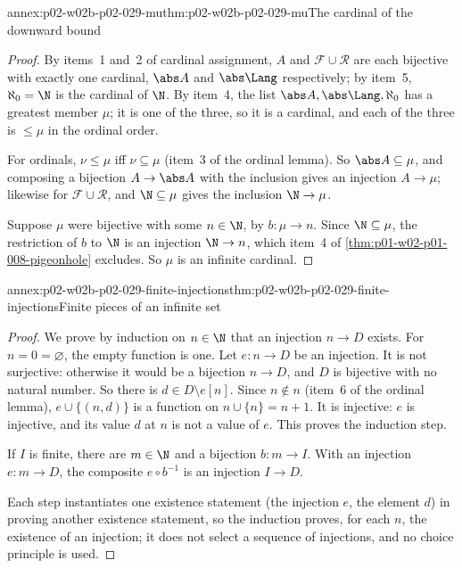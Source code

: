 \begin{annexitem}{annex:p02-w02b-p02-029-mu}{thm:p02-w02b-p02-029-mu}{The cardinal of the downward bound}
\begin{proof}
By items~1 and~2 of cardinal assignment, \(A\) and \(\mathcal F\cup\mathcal R\)
are each bijective with exactly one cardinal, \(\abs A\) and
\(\abs\Lang\) respectively; by item~5, \(\aleph_0=\N\) is the cardinal of
\(\N\). By item~4, the list \(\abs A,\abs\Lang,\aleph_0\) has a greatest
member \(\mu\); it is one of the three, so it is a cardinal, and each of the
three is \(\leq\mu\) in the ordinal order.

For ordinals, \(\nu\leq\mu\) iff \(\nu\subseteq\mu\) (item~3 of the ordinal
lemma). So \(\abs A\subseteq\mu\), and composing a bijection
\(A\to\abs A\) with the inclusion gives an injection \(A\to\mu\); likewise
for \(\mathcal F\cup\mathcal R\), and \(\N\subseteq\mu\) gives the inclusion
\(\N\to\mu\).

Suppose \(\mu\) were bijective with some \(n\in\N\), by \(b:\mu\to n\). Since
\(\N\subseteq\mu\), the restriction of \(b\) to \(\N\) is an injection
\(\N\to n\), which item~4 of \cref{thm:p01-w02-p01-008-pigeonhole} excludes.
So \(\mu\) is an infinite cardinal.
\end{proof}
\end{annexitem}

\begin{annexitem}{annex:p02-w02b-p02-029-finite-injections}{thm:p02-w02b-p02-029-finite-injections}{Finite pieces of an infinite set}
\begin{proof}
We prove by induction on \(n\in\N\) that an injection \(n\to D\) exists. For
\(n=0=\varnothing\), the empty function is one. Let \(e:n\to D\) be an
injection. It is not surjective: otherwise it would be a bijection
\(n\to D\), and \(D\) is bijective with no natural number. So there is
\(d\in D\setminus e[n]\). Since \(n\notin n\) (item~6 of the ordinal lemma),
\(e\cup\{(n,d)\}\) is a function on \(n\cup\{n\}=n+1\). It is injective:
\(e\) is injective, and its value \(d\) at \(n\) is not a value of \(e\).
This proves the induction step.

If \(I\) is finite, there are \(m\in\N\) and a bijection \(b:m\to I\). With
an injection \(e:m\to D\), the composite \(e\circ b^{-1}\) is an injection
\(I\to D\).

Each step instantiates one existence statement (the injection \(e\), the
element \(d\)) in proving another existence statement, so the induction
proves, for each \(n\), the existence of an injection; it does not select a
sequence of injections, and no choice principle is used.
\end{proof}
\end{annexitem}

